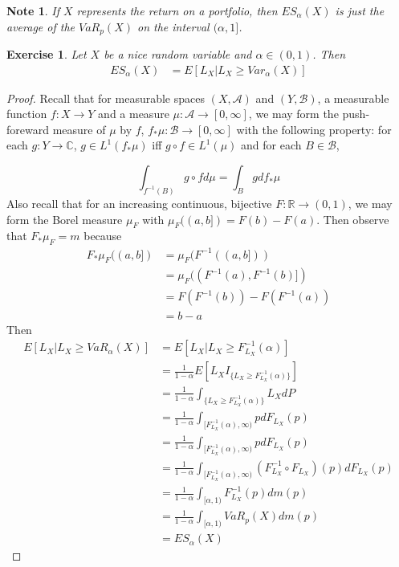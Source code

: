 \documentclass[12pt]{amsart}
\newtheorem{note}[thm]{Note}
\newtheorem{ex}[thm]{Exercise}
\newcommand{\al}{\alpha}
\newcommand{\C}{\mathbb{C}}
\newcommand{\R}{\mathbb{R}}
\newcommand{\MA}{\mathcal{A}}
\newcommand{\MB}{\mathcal{B}}
\newcommand{\RG}{[0,\infty]}
\begin{document}
\begin{note}
If $X$ represents the return on a portfolio, then $ES_{\al}(X)$ is just the average of the $VaR_{p}(X)$ on the interval $(\al, 1]$.
\end{note}

\begin{ex}
Let $X$ be a nice random variable and $\al\in (0,1)$. Then 
\begin{align*}
ES_{\al}(X) 
&= E[L_X|L_X \geq Var_{\al}(X)]
\end{align*}
\end{ex}

\begin{proof}
Recall that for measurable spaces $(X,\MA)$ and $(Y, \MB)$, a measurable function $f:X \rightarrow Y$ and a measure $\mu:\MA \rightarrow \RG$, we may form the push-foreward measure of $\mu$ by $f$, $f_{*}\mu:\MB \rightarrow \RG$ with the following property: for each $g:Y \rightarrow \C$, $g \in L^1(f_* \mu)$ iff  $g \circ f \in L^1(\mu)$ and for each $B \in \MB$, 

$$\int_{f^{-1}(B)}g \circ f d\mu = \int_B g d f_*\mu$$
Also recall that for an increasing continuous, bijective $F:\R \rightarrow (0,1)$, we may form the Borel measure $\mu_F$ with $\mu_F((a,b]) = F(b)-F(a)$. Then observe that $F_*\mu_F = m$ because
\begin{align*}
{F}_{*} \mu_F ((a,b]) 
&= \mu_F(F^{-1}((a,b]))\\
&= \mu_F((F^{-1}(a), F^{-1}(b)]) \\ 
&= F(F^{-1}(b)) - F(F^{-1}(a))\\
&= b-a
\end{align*}
Then  
\begin{align*}
E[L_X |L_X \geq VaR_{\al}(X)]
&= E[L_X|L_X \geq F^{-1}_{L_X}(\al)] \\ 
&= \frac{1}{1-\al}E [L_X I_{\{L_X \geq F^{-1}_{L_X}(\al)\}}] \\ 
&=  \frac{1}{1-\al} \int_{\{L_X \geq F_{L_X}^{-1}(\al)\}}L_X dP \\
&= \frac{1}{1-\al} \int_{[F_{L_X}^{-1}(\al),  \infty)}pd F_{L_X}(p) \\
&= \frac{1}{1-\al} \int_{[F_{L_X}^{-1}(\al),  \infty)}pd F_{L_X}(p) \\
&= \frac{1}{1-\al} \int_{[F_{L_X}^{-1}(\al),  \infty)}(F^{-1}_{L_X} \circ F_{L_X}) (p)d F_{L_X}(p) \\
&= \frac{1}{1-\al} \int_{[\al,  1)} F^{-1}_{L_X}(p)dm(p)\\
&= \frac{1}{1-\al} \int_{[\al,  1)} VaR_{p}(X)dm(p) \\
&= ES_{\al}(X)
\end{align*}
\end{proof}
\end{document}
